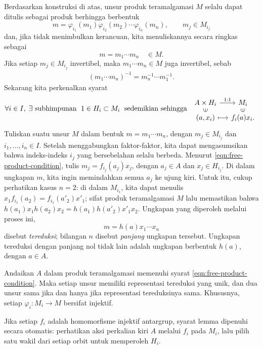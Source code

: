 Berdasarkan konstruksi di atas, unsur produk teramalgamasi $M$ selalu dapat ditulis sebagai produk berhingga berbentuk
\[ m = \varphi_{i_1}(m_1) \varphi_{i_2}(m_2) \cdots \varphi_{i_n}(m_n), \qquad m_j \in M_{i_j} \]
dan, jika tidak menimbulkan kerancuan, kita menuliskannya secara ringkas sebagai
\[ m = m_1 \cdots m_n \quad \in M. \]
Jika setiap $m_j \in M_{i_j}$ invertibel, maka $m_1 \cdots m_n \in M$ juga invertibel, sebab
\begin{gather}\label{eqn:word-inverse}
	(m_1 \cdots m_n)^{-1} = m_n^{-1} \cdots m_1^{-1}.
\end{gather}
Sekarang kita perkenalkan syarat
\begin{equation}\label{eqn:free-product-condition}\begin{gathered}
	\forall i \in I, \; \exists \text{ subhimpunan }\; 1 \in H_i \subset M_i \; \text{ sedemikian sehingga }\;
	\begin{tikzcd}[column sep=small, row sep=tiny]
		A \times H_i \arrow[r, "1:1"] & M_i \\
		(a, x_i) \arrow[mapsto, r] \arrow[phantom, u, sloped, "\in" description] & f_i(a) x_i. \arrow[phantom, u, sloped, "\in" description]
	\end{tikzcd}
\end{gathered}\end{equation}
Tuliskan suatu unsur $M$ dalam bentuk $m = m_1 \cdots m_n$, dengan $m_j \in M_{i_j}$ dan $i_1, \ldots, i_n \in I$. Setelah menggabungkan faktor-faktor, kita dapat mengasumsikan bahwa indeks-indeks $i_j$ yang bersebelahan selalu berbeda. Menurut \eqref{eqn:free-product-condition}, tulis $m_j = f_{i_j}(a_j) x_j$, dengan $a_j \in A$ dan $x_j \in H_{i_j}$. Di dalam ungkapan $m$, kita ingin memindahkan semua $a_j$ ke ujung kiri. Untuk itu, cukup perhatikan kasus $n=2$: di dalam $M_{i_1}$, kita dapat menulis $x_1 f_{i_1}(a_2) = f_{i_1}(a'_2) x'_1$; sifat produk teramalgamasi $M$ lalu memastikan bahwa $h(a_1) x_1 h(a_2) x_2 = h(a_1) h(a'_2) x'_1 x_2$. Ungkapan yang diperoleh melalui proses ini,
\[ m = h(a) x_1 \cdots x_n \]
disebut \emph{tereduksi}; bilangan $n$ disebut \emph{panjang} ungkapan tersebut. Ungkapan tereduksi dengan panjang nol tidak lain adalah ungkapan berbentuk $h(a)$, dengan $a \in A$.

\begin{lemma}
	Andaikan $A$ dalam produk teramalgamasi memenuhi syarat \eqref{eqn:free-product-condition}. Maka setiap unsur memiliki representasi tereduksi yang unik, dan dua unsur sama jika dan hanya jika representasi tereduksinya sama. Khususnya, setiap $\varphi_i: M_i \to M$ bersifat injektif.
\end{lemma}
Jika setiap $f_i$ adalah homomorfisme injektif antargrup, syarat lemma dipenuhi secara otomatis: perhatikan aksi perkalian kiri $A$ melalui $f_i$ pada $M_i$, lalu pilih satu wakil dari setiap orbit untuk memperoleh $H_i$.

